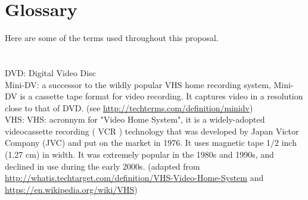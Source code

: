 %
\pagestyle{empty}
\hfill
{}
\section*{Glossary}

Here are some of the terms used throughout this proposal. \\
\\
\\
DVD: Digital Video Disc \\
Mini-DV: a successor to the wildly popular VHS home recording system, Mini-DV is a cassette tape format for video recording. It captures video in a resolution close to that of DVD. (see \url{http://techterms.com/definition/minidv}) \\
VHS: VHS: acronnym for "Video Home System", it is a widely-adopted videocassette recording ( VCR ) technology that was developed by Japan Victor Company (JVC) and put on the market in 1976. It uses magnetic tape 1/2 inch (1.27 cm) in width.  It was extremely popular in the 1980s and 1990s, and declined in use during the early 2000s. (adapted from \url{http://whatis.techtarget.com/definition/VHS-Video-Home-System} and \url{https://en.wikipedia.org/wiki/VHS}) \\

%
